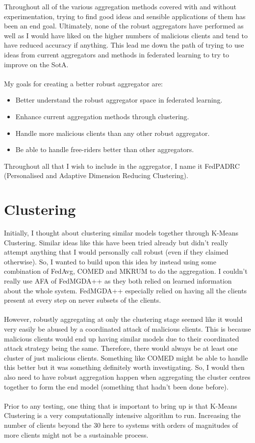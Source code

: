 Throughout all of the various aggregation methods covered with and without experimentation, trying to find good ideas and sensible applications of them has been an end goal.
Ultimately, none of the robust aggregators have performed as well as I would have liked on the higher numbers of malicious clients and tend to have reduced accuracy if anything.
This lead me down the path of trying to use ideas from current aggregators and methods in federated learning to try to improve on the SotA.
\\ \\
My goals for creating a better robust aggregator are:
\begin{itemize}
    \item Better understand the robust aggregator space in federated learning.
    \item Enhance current aggregation methods through clustering.
    \item Handle more malicious clients than any other robust aggregator.
    \item Be able to handle free-riders better than other aggregators.
\end{itemize}
Throughout all that I wish to include in the aggregator, I name it FedPADRC (Personalised and Adaptive Dimension Reducing Clustering).


\section{Clustering}
Initially, I thought about clustering similar models together through K-Means Clustering.
Similar ideas like this have been tried already \cite{cluster_robagg} but didn't really attempt anything that I would personally call robust (even if they claimed otherwise).
So, I wanted to build upon this idea by instead using some combination of FedAvg, COMED and MKRUM to do the aggregation.
I couldn't really use AFA of FedMGDA++ as they both relied on learned information about the whole system.
FedMGDA++ especially relied on having all the clients present at every step on never subsets of the clients.
\\ \\ 
However, robustly aggregating at only the clustering stage seemed like it would very easily be abused by a coordinated attack of malicious clients.
This is because malicious clients would end up having similar models due to their coordinated attack strategy being the same.
Therefore, there would always be at least one cluster of just malicious clients.
Something like COMED might be able to handle this better but it was something definitely worth investigating.
So, I would then also need to have robust aggregation happen when aggregating the cluster centres together to form the end model (something that hadn't been done before).
\\ \\
Prior to any testing, one thing that is important to bring up is that K-Means Clustering is a very computationally intensive algorithm to run.
Increasing the number of clients beyond the 30 here to systems with orders of magnitudes of more clients might not be a sustainable process.

